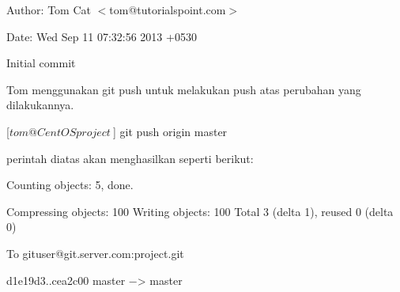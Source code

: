 Author: Tom Cat $<$tom@tutorialspoint.com$>$

Date: Wed Sep 11 07:32:56 2013 +0530

Initial commit\vspace{12pt}

Tom menggunakan git push untuk melakukan push atas perubahan yang dilakukannya.\par
\vspace{12pt}
[$tom@CentOS project ~$] git push origin master\par
\vspace{12pt}
perintah diatas akan menghasilkan seperti berikut:\par
\vspace{12pt}
Counting objects: 5, done.\par
\vspace{12pt}
Compressing objects: 100%
\vspace{12pt}
Writing objects: 100%
\vspace{12pt}
Total 3 (delta 1), reused 0 (delta 0)\par
\vspace{12pt}
To gituser@git.server.com:project.git\par
\vspace{12pt}
d1e19d3..cea2c00 master −> master\par



